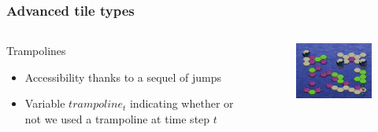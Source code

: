 \begin{frame}
	\frametitle{Advanced tile types}
	\begin{columns}
		\begin{column}{6cm}
			\begin{block}{Trampolines}
				\begin{itemize}
					\item Accessibility thanks to a sequel of jumps
					\item<2-> Variable $trampoline_t$ indicating whether or not
						  we used a trampoline at time step $t$
				\end{itemize}
			\end{block}
		\end{column}

		\begin{column}{6cm}
			\begin{figure}
				\centering
				\includegraphics[width=6cm]{images/trampolines.png}
			\end{figure}
		\end{column}
	\end{columns}
\end{frame}

